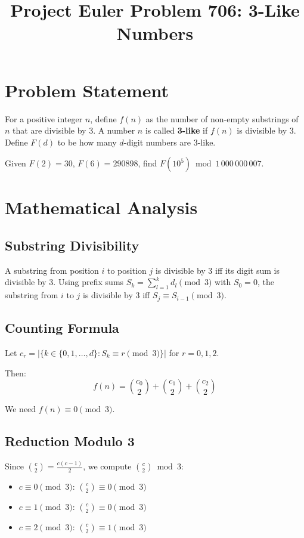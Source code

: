 \documentclass[12pt]{article}
\title{Project Euler Problem 706: 3-Like Numbers}
\author{}
\date{}
\begin{document}
\maketitle

\section{Problem Statement}
For a positive integer $n$, define $f(n)$ as the number of non-empty substrings of $n$ that are divisible by 3. A number $n$ is called \textbf{3-like} if $f(n)$ is divisible by 3. Define $F(d)$ to be how many $d$-digit numbers are 3-like.

Given $F(2) = 30$, $F(6) = 290898$, find $F(10^5) \bmod 1\,000\,000\,007$.

\section{Mathematical Analysis}

\subsection{Substring Divisibility}
A substring from position $i$ to position $j$ is divisible by 3 iff its digit sum is divisible by 3. Using prefix sums $S_k = \sum_{l=1}^{k} d_l \pmod{3}$ with $S_0 = 0$, the substring from $i$ to $j$ is divisible by 3 iff $S_j \equiv S_{i-1} \pmod{3}$.

\subsection{Counting Formula}
Let $c_r = |\{k \in \{0,1,\ldots,d\} : S_k \equiv r \pmod{3}\}|$ for $r = 0,1,2$.

Then:
\[
f(n) = \binom{c_0}{2} + \binom{c_1}{2} + \binom{c_2}{2}
\]

We need $f(n) \equiv 0 \pmod{3}$.

\subsection{Reduction Modulo 3}
Since $\binom{c}{2} = \frac{c(c-1)}{2}$, we compute $\binom{c}{2} \bmod 3$:
\begin{itemize}
    \item $c \equiv 0 \pmod{3}$: $\binom{c}{2} \equiv 0 \pmod{3}$
    \item $c \equiv 1 \pmod{3}$: $\binom{c}{2} \equiv 0 \pmod{3}$
    \item $c \equiv 2 \pmod{3}$: $\binom{c}{2} \equiv 1 \pmod{3}$
\end{itemize}
\end{document}
